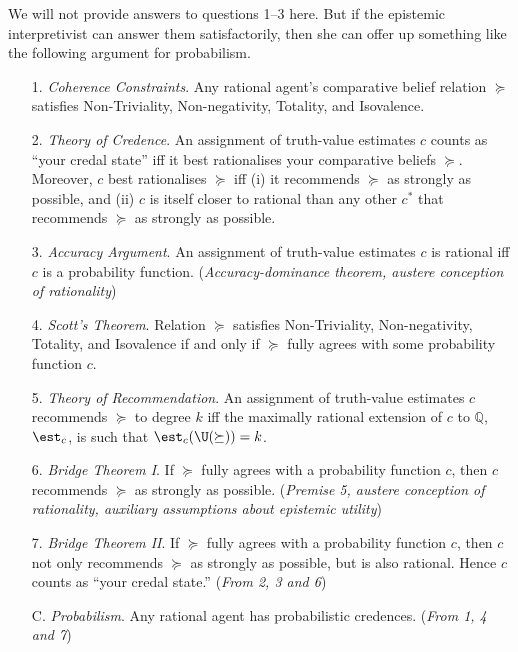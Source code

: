 We will not provide answers to questions 1--3 here. But if the epistemic interpretivist can answer them satisfactorily, then she can offer up something like the following argument for probabilism.
\begin{enumerate}
\item[1.] \textit{Coherence Constraints}. Any rational agent's comparative belief relation $\succeq$ satisfies Non-Triviality, Non-negativity, Totality, and Isovalence.
\item[2.] \textit{Theory of Credence}. An assignment of truth-value estimates $c$ counts as ``your credal state'' iff it best rationalises your comparative beliefs $\succeq$. Moreover, $c$ best rationalises $\succeq$ iff (i) it recommends $\succeq$ as strongly as possible, and (ii) $c$ is itself closer to rational than any other $c^*$ that recommends $\succeq$ as strongly as possible.
\item[3.] \textit{Accuracy Argument}. An assignment of truth-value estimates $c$ is rational iff $c$ is a probability function. (\textit{Accuracy-dominance theorem, austere conception of rationality})	
\item[4.] \textit{Scott's Theorem}. Relation $\succeq$ satisfies Non-Triviality, Non-negativity, Totality, and Isovalence if and only if $\succeq$ fully agrees with some probability function $c$.
\item[5.] \textit{Theory of Recommendation}.  An assignment of truth-value estimates $c$ recommends $\succeq$ to degree $k$ iff the maximally rational extension of $c$ to $\mathbb{Q}$, $\est_c$, is such that $\est_c(\U(\succeq))=k$.
\item[6.] \textit{Bridge Theorem I}. If $\succeq$ fully agrees with a probability function $c$, then $c$ recommends $\succeq$ as strongly as possible. (\textit{Premise 5, austere conception of rationality, auxiliary assumptions about epistemic utility})	
\item[7.] \textit{Bridge Theorem II}. If $\succeq$ fully agrees with a probability function $c$, then $c$ not only recommends $\succeq$ as strongly as possible, but is also rational. Hence $c$ counts as ``your credal state.'' (\textit{From 2, 3 and 6})
\item[C.] \textit{Probabilism}. Any rational agent has probabilistic credences. (\textit{From 1, 4 and 7})
\end{enumerate}
